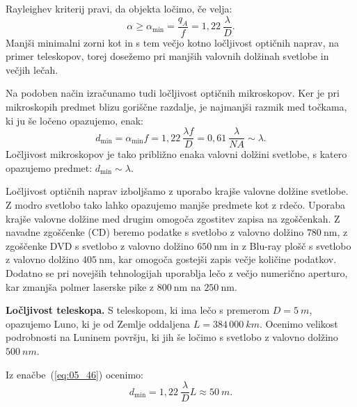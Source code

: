 Rayleighev kriterij pravi, da objekta ločimo, če velja:
\begin{equation}
\alpha \ge \alpha_{\mathrm{min}} = 
\frac{q_{A}}{f} = 1,22~\frac{\lambda}{D}.
\label{eq:05_46}
\end{equation}
Manjši minimalni zorni kot in s tem večjo kotno 
ločljivost optičnih naprav, na primer teleskopov, torej
dosežemo pri manjših valovnih dolžinah svetlobe in večjih lečah.

Na podoben način izračunamo tudi ločljivost optičnih mikroskopov. Ker
je pri mikroskopih predmet blizu goriščne razdalje, je najmanjši 
razmik med točkama, ki ju še ločeno opazujemo, enak:
\begin{equation}
d_\mathrm{min} = \alpha_{\mathrm{min}} f = 1,22~\frac{\lambda f}{D} = 
0,61~\frac{\lambda}{NA} \sim \lambda.
\label{eq:05_46aa}
\end{equation}
Ločljivost mikroskopov je tako približno enaka 
valovni dolžini svetlobe, s katero opazujemo predmet: 
$d_\mathrm{min} \sim \lambda$.

\begin{remark}
Ločljivost optičnih naprav izboljšamo z uporabo krajše valovne dolžine svetlobe.
Z modro svetlobo tako lahko opazujemo manjše predmete
kot z rdečo. Uporaba krajše valovne dolžine med drugim omogoča zgostitev 
zapisa na zgoščenkah. Z navadne zgoščenke (CD) beremo podatke s svetlobo z valovno 
dolžino $780~\si{\nano\metre}$, z zgoščenke DVD s svetlobo z valovno dolžino
$650~\si{\nano\metre}$ in z Blu-ray plošč s svetlobo z valovno dolžino
$405~\si{\nano\metre}$, kar omogoča gostejši zapis večje količine podatkov.
Dodatno se pri novejših tehnologijah uporablja lečo z večjo numerično
aperturo, kar zmanjša polmer laserske pike
z $800~\si{\nano\metre}$ na $250~\si{\nano\metre}$.
\end{remark}

\begin{example}{\bf Ločljivost teleskopa.}
S teleskopom, ki ima lečo s premerom $D=5~\si{m}$,
opazujemo Luno, ki je od Zemlje oddaljena $L = 384\,000~\si{km}$. 
Ocenimo velikost podrobnosti na Luninem površju, ki jih še ločimo
s svetlobo z valovno dolžino $500~\si{nm}$. 

Iz enačbe~(\ref{eq:05_46}) ocenimo:
\begin{equation}
d_\mathrm{min} = 1,22~\frac{\lambda}{D} L \approx 50~\si{m}.
\label{eq:05_47}
\end{equation}
\end{example}

